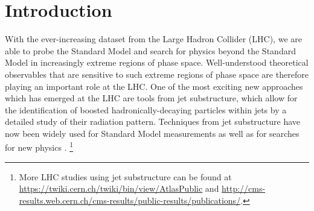 \documentclass[11pt,letterpaper]{article}
\begin{document}
\maketitle

\section{Introduction}\label{sec:intro}



With the ever-increasing dataset from the Large Hadron Collider (LHC), we are able to probe the Standard Model and search for physics beyond the Standard Model in increasingly extreme regions of phase space.
%
Well-understood theoretical observables that are sensitive to such extreme regions of phase space are therefore playing an important role at the LHC.
%
One of the most exciting new approaches which has emerged at the LHC are tools from jet substructure, which allow for the identification of boosted hadronically-decaying particles within jets by a detailed study of their radiation pattern.
%
Techniques from jet substructure have now been widely used for Standard Model measurements \cite{Chatrchyan:2012sn,CMS:2013cda,Aad:2015cua,Aad:2015lxa,ATLAS-CONF-2015-035,Aad:2015rpa,Aad:2015hna,ATLAS-CONF-2016-002,ATLAS-CONF-2016-039,ATLAS-CONF-2016-034,CMS-PAS-TOP-16-013,CMS-PAS-HIG-16-004} as well as for searches for new physics  \cite{CMS:2011bqa,Fleischmann:2013woa,Pilot:2013bla,TheATLAScollaboration:2013qia,Chatrchyan:2012ku,CMS-PAS-B2G-14-001,CMS-PAS-B2G-14-002,Khachatryan:2015axa,Khachatryan:2015bma,Aad:2015owa,Aaboud:2016okv,Aaboud:2016trl,Aaboud:2016qgg,ATLAS-CONF-2016-055,ATLAS-CONF-2015-071,ATLAS-CONF-2015-068,CMS-PAS-EXO-16-037,CMS-PAS-EXO-16-040,Khachatryan:2016mdm,CMS-PAS-HIG-16-016,CMS-PAS-B2G-15-003,CMS-PAS-EXO-16-017}.%
\footnote{More LHC studies using jet substructure can be found at \url{https://twiki.cern.ch/twiki/bin/view/AtlasPublic} and \url{http://cms-results.web.cern.ch/cms-results/public-results/publications/}.} 
\end{document}
